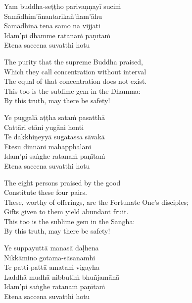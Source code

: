\begin{pali-hang-continued}
  Yam buddha-seṭṭho parivaṇṇayī suciṁ\\
  Samādhim'ānantarikañ'ñam'āhu\\
  Samādhinā tena samo na vijjati\\
  Idam'pi dhamme ratanaṁ paṇītaṁ\\
  Etena saccena suvatthi hotu
\end{pali-hang-continued}

\begin{english-verses}
  The purity that the supreme Buddha praised,\\
  Which they call concentration without interval\\
  The equal of that concentration does not exist.\\
  This too is the sublime gem in the Dhamma:\\
  By this truth, may there be safety!
\end{english-verses}

\begin{pali-hang-continued}
  Ye puggalā aṭṭha sataṁ pasatthā\\
  Cattāri etāni yugāni honti\\
  Te dakkhiṇeyyā sugatassa sāvakā\\
  Etesu dinnāni mahapphalāni\\
  Idam'pi saṅghe ratanaṁ paṇītaṁ\\
  Etena saccena suvatthi hotu
\end{pali-hang-continued}

\begin{english-verses}
  The eight persons praised by the good\\
  Constitute these four pairs.\\
  These, worthy of offerings, are the Fortunate One's disciples;\\
  Gifts given to them yield abundant fruit.\\
  This too is the sublime gem in the Sangha:\\
  By this truth, may there be safety!
\end{english-verses}

\begin{pali-hang-continued}
  Ye suppayuttā manasā daḷhena\\
  Nikkāmino gotama-sāsanamhi\\
  Te patti-pattā amataṁ vigayha\\
  Laddhā mudhā nibbutiṁ bhuñjamānā\\
  Idam'pi saṅghe ratanaṁ paṇītaṁ\\
  Etena saccena suvatthi hotu
\end{pali-hang-continued}

